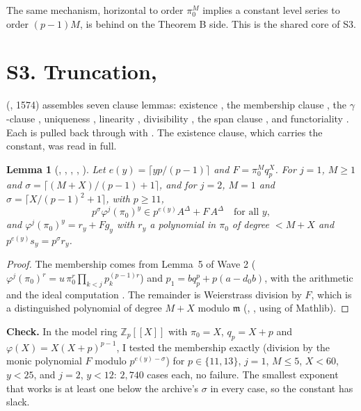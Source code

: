 \documentclass[11pt]{article}
\newtheorem{lemma}{Lemma}
\theoremstyle{definition}
\theoremstyle{remark}
\begin{document}
The same mechanism, horizontal to order $\pi_0^M$ implies a constant level series to order $(p-1)M$, is  behind  on the Theorem B side. This is the shared core of S3.

\section{S3. Truncation, \texorpdfstring{}{TTool2}}\label{sec:ttool2}

 (, 1574) assembles seven clause lemmas: existence , the membership clause , the $\gamma$-clause , uniqueness , linearity , divisibility , the span clause , and functoriality . Each is pulled back through  with . The existence clause, which carries the constant, was read in full.

\begin{lemma}[, , , , ]\label{lem:sig}
Let $e(y)=\lceil yp/(p-1)\rceil$ and $F=\pi_0^Mq_p^X$. For $j=1$, $M\ge1$ and $\sigma=\lceil(M+X)/(p-1)+1\rceil$, and for $j=2$, $M=1$ and $\sigma=\lceil X/(p-1)^2+1\rceil$, with $p\ge11$,
\[
p^\sigma\varphi^j(\pi_0)^y\in p^{e(y)}A^\Delta+F\,A^\Delta\quad\text{for all }y,
\]
and $\varphi^j(\pi_0)^y=r_y+F g_y$ with $r_y$ a polynomial in $\pi_0$ of degree $<M+X$ and $p^{e(y)}s_y=p^\sigma r_y$.
\end{lemma}
\begin{proof}
The membership comes from Lemma~5 of Wave 2 ($\varphi^j(\pi_0)^r=u\,\pi_0^r\prod_{k<j}p_k^{(p-1)r}$) and $p_1=bq_p^p+p(a-d_0b)$, with the arithmetic  and the ideal computation . The remainder is Weierstrass division by $F$, which is a distinguished polynomial of degree $M+X$ modulo $\mathfrak m$ (, , using  of Mathlib).
\end{proof}

\noindent\textbf{Check.} In the model ring $\mathbb Z_p[[X]]$ with $\pi_0=X$, $q_p=X+p$ and $\varphi(X)=X(X+p)^{p-1}$, I tested the membership exactly (division by the monic polynomial $F$ modulo $p^{e(y)-\sigma}$) for $p\in\{11,13\}$, $j=1$, $M\le5$, $X<60$, $y<25$, and $j=2$, $y<12$: $2{,}740$ cases each, no failure. The smallest exponent that works is at least one below the archive's $\sigma$ in every case, so the constant has slack.
\end{document}
